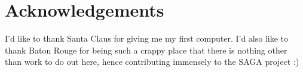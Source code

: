 \documentclass[a4paper,10pt]{article}
\begin{document}
\section{Acknowledgements}
 
I'd like to thank Santa Claus for giving me my first computer. I'd also like 
to thank Baton Rouge for being such a crappy place that there is nothing other
than work to do out here, hence contributing immensely to the SAGA project :) 


  
 
\end{document}
